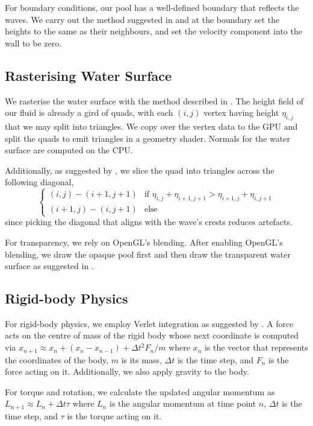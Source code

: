 For boundary conditions, our pool has a well-defined boundary that reflects the waves. We carry out the method suggested in \cite{lec:waves} and at the boundary set the heights to the same as their neighbours, and set the velocity component into the wall to be zero.

\subsection{Rasterising Water Surface}

We rasterise the water surface with the method described in \cite{hfluid}.
The height field of our fluid is already a gird of quads, with each $(i,j)$ vertex having height $\eta_{i,j}$ that we may split into triangles.
We copy over the vertex data to the GPU and split the quads to emit triangles in a geometry shader.
Normals for the water surface are computed on the CPU.

Additionally, as suggested by \cite{hfluid}, we slice the quad into triangles across the following diagonal,
$$
\begin{cases}
    (i,j) - (i+1, j+1) & \text{if }\eta_{i,j} + \eta_{i+1,j+1} > \eta_{i+1,j}+\eta_{i,j+1} \\
    (i+1, j) - (i, j+1) & \text{else}
\end{cases}
$$
since picking the diagonal that aligns with the wave's crests reduces artefacts.

For transparency, we rely on OpenGL's blending.
After enabling OpenGL's blending, we draw the opaque pool first and then draw the transparent water surface as suggested in \cite{LearnOpenGL:Ch24}.

\subsection{Rigid-body Physics}

For rigid-body physics, we employ Verlet integration as suggested by \cite{lec:particles}.
A force acts on the centre of mass of the rigid body whose next coordinate is computed via 
$x_{n+1} \approx x_n + (x_n - x_{n-1}) + \Delta t^2 F_n/m$
where $x_n$ is the vector that represents the coordinates of the body, $m$ is its mass, $\Delta t$ is the time step, and $F_n$ is the force acting on it. Additionally, we also apply gravity to the body.

For torque and rotation, we calculate the updated angular momentum as $L_{n+1} \approx L_n + \Delta t \tau$ where $L_n$ is the angular momentum at time point $n$, $\Delta t$ is the time step, and $\tau$ is the torque acting on it.

